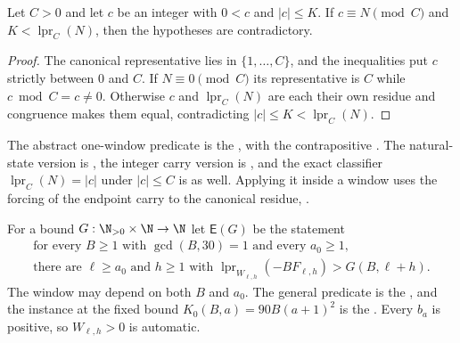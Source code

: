 \documentclass[11pt]{article}
\newcommand{\lpr}{\operatorname{lpr}}
\newcommand{\Esc}{\mathsf E}
\begin{document}
\begin{proposition}\label{long269:res:consumer}
Let $C>0$ and let $c$ be an integer with $0<c$ and $|c|\le K$.  If
$c\equiv N\pmod C$ and $K<\lpr_C(N)$, then the hypotheses are contradictory.
\end{proposition}

\begin{proof}
The canonical representative lies in $\{1,\ldots,C\}$, and the inequalities put
$c$ strictly between $0$ and $C$.  If $N\equiv0\pmod C$ its representative is
$C$ while $c\bmod C=c\ne0$.  Otherwise $c$ and $\lpr_C(N)$ are each their own
residue and congruence makes them equal, contradicting $|c|\le K<\lpr_C(N)$.
\end{proof}

\noindent The abstract one-window predicate is the
, with the contrapositive
.  The natural-state version is
,
the integer carry version is
,
and the exact classifier $\lpr_C(N)=|c|$ under $|c|\le C$ is
as well.  Applying it inside a window uses the forcing of the endpoint carry to
the canonical residue,
.

For a bound $G:\N_{>0}\times\N\to\N$ let $\Esc(G)$ be the statement
\begin{equation}\label{long269:eq:actual-escape}
 \begin{gathered}
 \text{for every }B\ge1\text{ with }\gcd(B,30)=1\text{ and every }a_0\ge1,\\
 \text{there are }\ell\ge a_0\text{ and }h\ge1\text{ with }
 \lpr_{W_{\ell,h}}(-BF_{\ell,h})>G(B,\ell+h) .
 \end{gathered}
\end{equation}
The window may depend on both $B$ and $a_0$.  The general predicate is the
, and the instance at the fixed bound
$K_0(B,a)=90B(a+1)^{2}$ is the
.  Every $b_a$ is positive, so $W_{\ell,h}>0$ is automatic.
\end{document}
